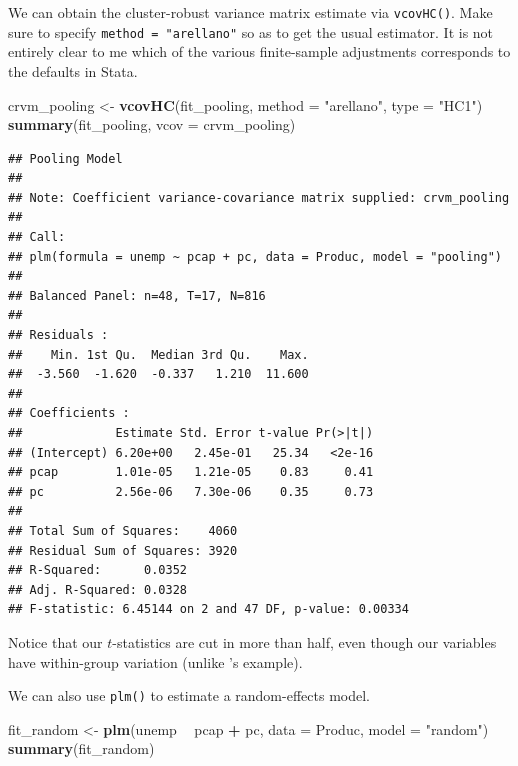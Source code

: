 \documentclass[12pt,oneside,openany]{book}
\newenvironment{Shaded}{\begin{snugshade}}{\end{snugshade}}
\newcommand{\KeywordTok}[1]{\textcolor[rgb]{0.13,0.29,0.53}{\textbf{#1}}}
\newcommand{\DataTypeTok}[1]{\textcolor[rgb]{0.13,0.29,0.53}{#1}}
\newcommand{\StringTok}[1]{\textcolor[rgb]{0.31,0.60,0.02}{#1}}
\newcommand{\OperatorTok}[1]{\textcolor[rgb]{0.81,0.36,0.00}{\textbf{#1}}}
\newcommand{\NormalTok}[1]{#1}
\begin{document}
We can obtain the cluster-robust variance matrix estimate via
\texttt{vcovHC()}. Make sure to specify \texttt{method\ =\ "arellano"}
so as to get the usual estimator. It is not entirely clear to me which
of the various finite-sample adjustments corresponds to the defaults in
Stata.

\begin{Shaded}
\begin{Highlighting}[]
\NormalTok{crvm_pooling <-}\StringTok{ }\KeywordTok{vcovHC}\NormalTok{(fit_pooling,}
                       \DataTypeTok{method =} \StringTok{"arellano"}\NormalTok{,}
                       \DataTypeTok{type =} \StringTok{"HC1"}\NormalTok{)}
\KeywordTok{summary}\NormalTok{(fit_pooling, }\DataTypeTok{vcov =}\NormalTok{ crvm_pooling)}
\end{Highlighting}
\end{Shaded}

\begin{verbatim}
## Pooling Model
## 
## Note: Coefficient variance-covariance matrix supplied: crvm_pooling
## 
## Call:
## plm(formula = unemp ~ pcap + pc, data = Produc, model = "pooling")
## 
## Balanced Panel: n=48, T=17, N=816
## 
## Residuals :
##    Min. 1st Qu.  Median 3rd Qu.    Max. 
##  -3.560  -1.620  -0.337   1.210  11.600 
## 
## Coefficients :
##             Estimate Std. Error t-value Pr(>|t|)
## (Intercept) 6.20e+00   2.45e-01   25.34   <2e-16
## pcap        1.01e-05   1.21e-05    0.83     0.41
## pc          2.56e-06   7.30e-06    0.35     0.73
## 
## Total Sum of Squares:    4060
## Residual Sum of Squares: 3920
## R-Squared:      0.0352
## Adj. R-Squared: 0.0328
## F-statistic: 6.45144 on 2 and 47 DF, p-value: 0.00334
\end{verbatim}

Notice that our \(t\)-statistics are cut in more than half, even though
our variables have within-group variation (unlike
\citet{Moulton:1990bl}'s example).

We can also use \texttt{plm()} to estimate a random-effects model.

\begin{Shaded}
\begin{Highlighting}[]
\NormalTok{fit_random <-}\StringTok{ }\KeywordTok{plm}\NormalTok{(unemp }\OperatorTok{~}\StringTok{ }\NormalTok{pcap }\OperatorTok{+}\StringTok{ }\NormalTok{pc,}
                  \DataTypeTok{data =}\NormalTok{ Produc,}
                  \DataTypeTok{model =} \StringTok{"random"}\NormalTok{)}
\KeywordTok{summary}\NormalTok{(fit_random)}
\end{Highlighting}
\end{Shaded}
\end{document}
